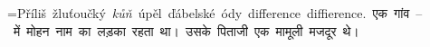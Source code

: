 \documentclass{article}
\begin{document}

=\hbox{Příliš žluťoučký \textit{kůň} úpěl \hbox{ďábelské} ódy difference diffierence. \devanagarifam एक गांव -- में मोहन नाम का लड़का रहता था। उसके पिताजी एक मामूली मजदूर थे।}


\end{document}

